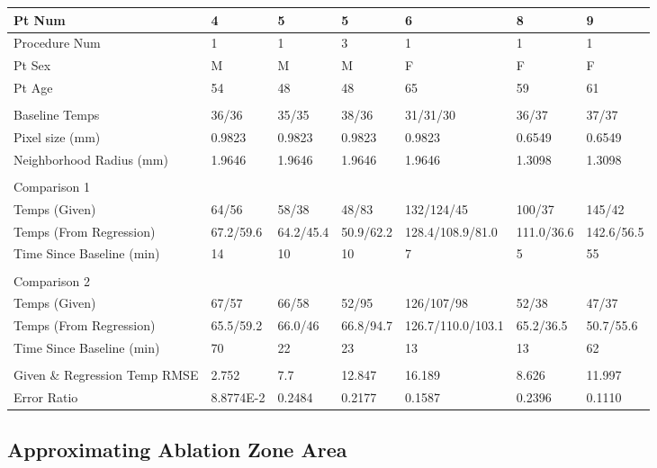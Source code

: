 \documentclass[]{spie}  %
\begin{document}
\begin{tabular}{ | l | l | l | l | l | l | l | }
\hline
	Pt Num & 4 & 5 & 5 & 6 & 8 & 9 \\ \hline
	Procedure Num & 1 & 1 & 3 & 1 & 1 & 1 \\ \hline
	Pt Sex & M & M & M & F & F & F \\ \hline
	Pt Age & 54 & 48 & 48 & 65 & 59 & 61 \\ \hline
	 &  &  &  &  &  &  \\ \hline
	Baseline Temps & 36/36 & 35/35 & 38/36 & 31/31/30 & 36/37 & 37/37 \\ \hline
	Pixel size (mm) & 0.9823 & 0.9823 & 0.9823 & 0.9823 & 0.6549 & 0.6549 \\ \hline
	Neighborhood Radius (mm) & 1.9646 & 1.9646 & 1.9646 & 1.9646 & 1.3098 & 1.3098 \\ \hline
	 &  &  &  &  &  &  \\ \hline
	Comparison 1 &  &  &  &  &  &  \\ \hline
	Temps (Given) & 64/56 & 58/38 & 48/83 & 132/124/45 & 100/37 & 145/42 \\ \hline
	Temps (From Regression) & 67.2/59.6 & 64.2/45.4 & 50.9/62.2 & 128.4/108.9/81.0 & 111.0/36.6 & 142.6/56.5 \\ \hline
	Time Since Baseline (min) & 14 & 10 & 10 & 7 & 5 & 55 \\ \hline
	 &  &  &  &  &  &  \\ \hline
	Comparison 2 &  &  &  &  &  &  \\ \hline
	Temps (Given) & 67/57 & 66/58 & 52/95 & 126/107/98 & 52/38 & 47/37 \\ \hline
	Temps (From Regression) & 65.5/59.2 & 66.0/46 & 66.8/94.7 & 126.7/110.0/103.1 & 65.2/36.5 & 50.7/55.6 \\ \hline
	Time Since Baseline (min) & 70 & 22 & 23 & 13 & 13 & 62 \\ \hline
	&  &  &  &  &  &  \\ \hline
	Given \& Regression Temp RMSE & 2.752 & 7.7 & 12.847 & 16.189 & 8.626 & 11.997 \\ \hline
	Error Ratio & 8.8774E-2 & 0.2484 & 0.2177 & 0.1587 & 0.2396 & 0.1110 \\ \hline
\end{tabular}
 

\subsection{Approximating Ablation Zone Area}
\end{document}

